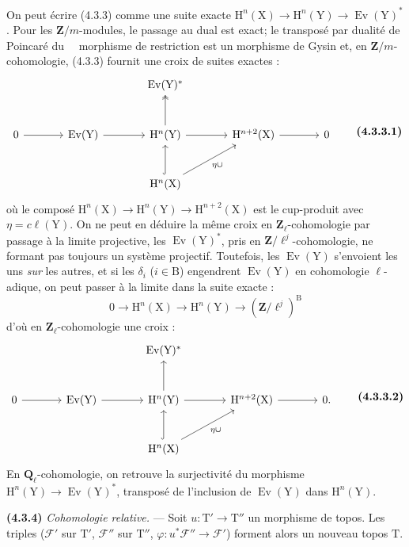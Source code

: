 \documentclass[11pt,leqno]{article}
\newcommand{\Page}[1]{\ifvmode\noindent\else\unskip\ \fi{\footnotesize\textcolor{gray}{[p.\,#1]}}\ \ignorespaces}
\begin{document}
On peut écrire (4.3.3) comme une suite exacte \(\mathrm{H}^n(\mathrm{X})\to\mathrm{H}^n(\mathrm{Y})\to\operatorname{Ev}(\mathrm{Y})^*\). Pour les \(\mathbf{Z}/m\)-modules, le passage au dual est exact; le transposé par dualité de Poincaré du
\Page{223}morphisme de restriction est un morphisme de Gysin et, en \(\mathbf{Z}/m\)-cohomologie, (4.3.3) fournit une croix de suites exactes :
\[
\begin{tikzcd}[column sep=large,row sep=large]
{} & {} & \operatorname{Ev}(\mathrm{Y})^* & {} & {} \\
0 \arrow[r]
  & \operatorname{Ev}(\mathrm{Y}) \arrow[r]
  & \mathrm{H}^n(\mathrm{Y}) \arrow[r] \arrow[u,two heads]
  & \mathrm{H}^{n+2}(\mathrm{X}) \arrow[r]
  & 0 \\
{} & {}
  & \mathrm{H}^n(\mathrm{X}) \arrow[u,hook] \arrow[ur,"\eta\cup"']
  & {} & {}
\end{tikzcd}
\tag*{\textbf{(4.3.3.1)}}
\]
où le composé \(\mathrm{H}^n(\mathrm{X})\to\mathrm{H}^n(\mathrm{Y})\to\mathrm{H}^{n+2}(\mathrm{X})\) est le cup-produit avec \(\eta=c\ell(\mathrm{Y})\). On ne peut en déduire la même croix en \(\mathbf{Z}_\ell\)-cohomologie par passage à la limite projective, les \(\operatorname{Ev}(\mathrm{Y})^*\), pris en \(\mathbf{Z}/\ell^j\)-cohomologie, ne formant pas toujours un système projectif. Toutefois, les \(\operatorname{Ev}(\mathrm{Y})\) s’envoient les uns \textit{sur} les autres, et si les \(\delta_i\) (\(i\in\mathrm{B}\)) engendrent \(\operatorname{Ev}(\mathrm{Y})\) en cohomologie \(\ell\)-adique, on peut passer à la limite dans la suite exacte :
\[
0\to\mathrm{H}^n(\mathrm{X})
\to\mathrm{H}^n(\mathrm{Y})
\to(\mathbf{Z}/\ell^j)^{\mathrm{B}}
\]
d’où en \(\mathbf{Z}_\ell\)-cohomologie une croix :
\[
\begin{tikzcd}[column sep=large,row sep=large]
{} & {} & \operatorname{Ev}(\mathrm{Y})^* & {} & {} \\
0 \arrow[r]
  & \operatorname{Ev}(\mathrm{Y}) \arrow[r]
  & \mathrm{H}^n(\mathrm{Y}) \arrow[r] \arrow[u]
  & \mathrm{H}^{n+2}(\mathrm{X}) \arrow[r]
  & 0. \\
{} & {}
  & \mathrm{H}^n(\mathrm{X}) \arrow[u,hook] \arrow[ur,"\eta\cup"']
  & {} & {}
\end{tikzcd}
\tag*{\textbf{(4.3.3.2)}}
\]
En \(\mathbf{Q}_\ell\)-cohomologie, on retrouve la surjectivité du morphisme \(\mathrm{H}^n(\mathrm{Y})\to\operatorname{Ev}(\mathrm{Y})^*\), transposé de l’inclusion de \(\operatorname{Ev}(\mathrm{Y})\) dans \(\mathrm{H}^n(\mathrm{Y})\).

\textbf{(4.3.4)} \textit{Cohomologie relative.} — Soit \(u:\mathrm{T}'\to\mathrm{T}''\) un morphisme de topos. Les triples (\(\mathscr{F}'\) sur \(\mathrm{T}'\), \(\mathscr{F}''\) sur \(\mathrm{T}''\), \(\varphi:u^*\mathscr{F}''\to\mathscr{F}'\)) forment alors un nouveau topos \(\mathrm{T}\).
\end{document}
